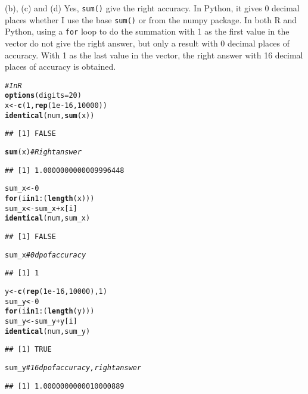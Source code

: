 \documentclass{article}\usepackage[]{graphicx}\usepackage[]{color}
\makeatletter
\newcommand{\hlnum}[1]{\textcolor[rgb]{0.686,0.059,0.569}{#1}}%
\newcommand{\hlcom}[1]{\textcolor[rgb]{0.678,0.584,0.686}{\textit{#1}}}%
\newcommand{\hlopt}[1]{\textcolor[rgb]{0,0,0}{#1}}%
\newcommand{\hlstd}[1]{\textcolor[rgb]{0.345,0.345,0.345}{#1}}%
\newcommand{\hlkwa}[1]{\textcolor[rgb]{0.161,0.373,0.58}{\textbf{#1}}}%
\newcommand{\hlkwb}[1]{\textcolor[rgb]{0.69,0.353,0.396}{#1}}%
\newcommand{\hlkwc}[1]{\textcolor[rgb]{0.333,0.667,0.333}{#1}}%
\newcommand{\hlkwd}[1]{\textcolor[rgb]{0.737,0.353,0.396}{\textbf{#1}}}%
\newenvironment{kframe}{%
 \def\at@end@of@kframe{}%
 \ifinner\ifhmode%
  \def\at@end@of@kframe{\end{minipage}}%
  \begin{minipage}{\columnwidth}%
 \fi\fi%
 \def\FrameCommand##1{\hskip\@totalleftmargin \hskip-\fboxsep
 \colorbox{shadecolor}{##1}\hskip-\fboxsep
     \hskip-\linewidth \hskip-\@totalleftmargin \hskip\columnwidth}%
 \MakeFramed {\advance\hsize-\width
   \@totalleftmargin\z@ \linewidth\hsize
   \@setminipage}}%
 {\par\unskip\endMakeFramed%
 \at@end@of@kframe}
\newenvironment{knitrout}{}{} %
\makeatother
\begin{document}
(b), (c) and (d)
Yes, \texttt{sum()} give the right accuracy. In Python, it gives 0 decimal places whether I use the base \texttt{sum()} or from the numpy package. In both R and Python, using a \texttt{for} loop to do the summation with 1 as the first value in the vector do not give the right answer, but only a result with 0 decimal places of accuracy. With 1 as the last value in the vector, the right answer with 16 decimal places of accuracy is obtained.

\begin{knitrout}
\color{fgcolor}\begin{kframe}
\begin{alltt}
\hlcom{# In R}
\hlkwd{options}\hlstd{(}\hlkwc{digits} \hlstd{=} \hlnum{20}\hlstd{)}
\hlstd{x} \hlkwb{<-} \hlkwd{c}\hlstd{(}\hlnum{1}\hlstd{,} \hlkwd{rep}\hlstd{(}\hlnum{1e-16}\hlstd{,} \hlnum{10000}\hlstd{))}
\hlkwd{identical}\hlstd{(num,} \hlkwd{sum}\hlstd{(x))}
\end{alltt}
\begin{verbatim}
## [1] FALSE
\end{verbatim}
\begin{alltt}
\hlkwd{sum}\hlstd{(x)} \hlcom{# Right answer}
\end{alltt}
\begin{verbatim}
## [1] 1.0000000000009996448
\end{verbatim}
\begin{alltt}
\hlstd{sum_x} \hlkwb{<-} \hlnum{0}
\hlkwa{for} \hlstd{(i} \hlkwa{in} \hlnum{1}\hlopt{:}\hlstd{(}\hlkwd{length}\hlstd{(x)))}
  \hlstd{sum_x} \hlkwb{<-} \hlstd{sum_x} \hlopt{+} \hlstd{x[i]}
\hlkwd{identical}\hlstd{(num, sum_x)}
\end{alltt}
\begin{verbatim}
## [1] FALSE
\end{verbatim}
\begin{alltt}
\hlstd{sum_x} \hlcom{# 0 dp of accuracy}
\end{alltt}
\begin{verbatim}
## [1] 1
\end{verbatim}
\begin{alltt}
\hlstd{y} \hlkwb{<-} \hlkwd{c}\hlstd{(}\hlkwd{rep}\hlstd{(}\hlnum{1e-16}\hlstd{,} \hlnum{10000}\hlstd{),} \hlnum{1}\hlstd{)}
\hlstd{sum_y} \hlkwb{<-} \hlnum{0}
\hlkwa{for} \hlstd{(i} \hlkwa{in} \hlnum{1}\hlopt{:}\hlstd{(}\hlkwd{length}\hlstd{(y)))}
  \hlstd{sum_y} \hlkwb{<-} \hlstd{sum_y} \hlopt{+} \hlstd{y[i]}
\hlkwd{identical}\hlstd{(num, sum_y)}
\end{alltt}
\begin{verbatim}
## [1] TRUE
\end{verbatim}
\begin{alltt}
\hlstd{sum_y} \hlcom{# 16 dp of accuracy, right answer}
\end{alltt}
\begin{verbatim}
## [1] 1.0000000000010000889
\end{verbatim}
\end{kframe}
\end{knitrout}
\end{document}
